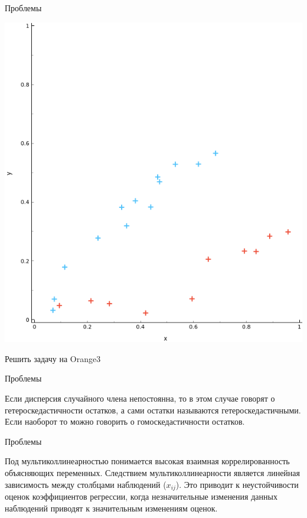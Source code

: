 \documentclass[10pt,pdf,hyperref={unicode}]{beamer}
\begin{document}
\begin{frame}{Проблемы}

\includegraphics[scale=0.4]{images/problem.png}

Решить задачу на Orange3

\end{frame}


\begin{frame}{Проблемы}

Если  дисперсия случайного члена непостоянна, то в этом случае 
говорят о гетероскедастичности остатков, 
а сами остатки называются гетероскедастичными.  
Если наоборот  то можно говорить о  гомоскедастичности остатков.




\end{frame}

\begin{frame}{Проблемы}

Под мультиколлинеарностью понимается высокая взаимная коррелированность 
объясняющих переменных. Следствием мультиколлинеарности является 
линейная зависимость между столбцами наблюдений ($x_{ij}$). Это приводит к неустойчивости 
оценок коэффициентов регрессии, когда незначительные изменения данных 
наблюдений приводят к значительным изменениям оценок. 



\end{frame}
\end{document}
